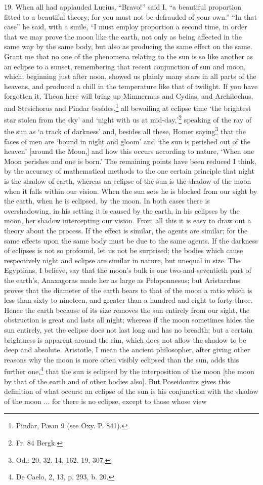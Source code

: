 \documentclass[a4paper, 11pt, oneside, polutonikogreek, english]{article}
\begin{document}
19. When all had applauded Lucius, ``Bravo!'' said I, ``a beautiful proportion fitted to a beautiful theory; for you must not be defrauded of your own.'' ``In that case'' he said, with a smile, ``I must employ proportion a second time, in order that we may prove the moon like the earth, not only as being affected in the same way by the same body, but also as producing the same effect on the same. Grant me that no one of the phenomena relating to the sun is so like another as an eclipse to a sunset, remembering that recent conjunction of sun and moon, which, beginning just after noon, showed us plainly many stars in all parts of the heavens, and produced a chill in the temperature like that of twilight. If you have forgotten it, Theon here will bring up Mimnermus and Cydias, and Archilochus, and Stesichorus and Pindar besides,\footnote{Pindar, Pæan 9 (see Oxy. P. 841).} all bewailing at eclipse time `the brightest star stolen from the sky' and `night with us at mid-day,'\footnote{Fr. 84 Bergk.} speaking of the ray of the sun as `a track of darkness' and, besides all these, Homer saying\footnote{Od.: 20, 32. 14, 162. 19, 307.} that the faces of men are `bound in night and gloom' and `the sun is perished out of the heaven' [around the Moon,] and how this occurs according to nature, `When one Moon perishes and one is born.' The remaining points have been reduced I think, by the accuracy of mathematical methods to the one certain principle that night is the shadow of earth, whereas an eclipse of the sun is the shadow of the moon when it falls within our vision. When the sun sets he is blocked from our sight by the earth, when he is eclipsed, by the moon. In both cases there is overshadowing, in his setting it is caused by the earth, in his eclipses by the moon, her shadow intercepting our vision. From all this it is easy to draw out a theory about the process. If the effect is similar, the agents are similar; for the same effects upon the same body must be due to the same agents. If the darkness of eclipses is not so profound, let us not be surprised; the bodies which cause respectively night and eclipse are similar in nature, but unequal in size. The Egyptians, I believe, say that the moon's bulk is one two-and-seventieth part of the earth's, Anaxagoras made her as large as Peloponnesus; but Aristarchus proves that the diameter of the earth bears to that of the moon a ratio which is less than sixty to nineteen, and greater than a hundred and eight to forty-three. Hence the earth because of its size removes the sun entirely from our sight, the obstruction is great and lasts all night; whereas if the moon sometimes hides the sun entirely, yet the eclipse does not last long and has no breadth; but a certain brightness is apparent around the rim, which does not allow the shadow to be deep and absolute. Aristotle, I mean the ancient philosopher, after giving other reasons why the moon is more often visibly eclipsed than the sun, adds this further one,\footnote{De Caelo, 2, 13, p. 293, b. 20.} that the sun is eclipsed by the interposition of the moon [the moon by that of the earth and of other bodies also]. But Poseidonius gives this definition of what occurs: an eclipse of the sun is his conjunction with the shadow of the moon ... for there is no eclipse, except to those whose view 
\end{document}
